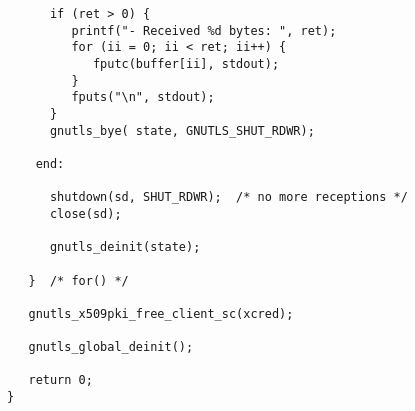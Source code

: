 \begin{verbatim}
      if (ret > 0) {
         printf("- Received %d bytes: ", ret);
         for (ii = 0; ii < ret; ii++) {
            fputc(buffer[ii], stdout);
         }
         fputs("\n", stdout);
      }
      gnutls_bye( state, GNUTLS_SHUT_RDWR);

    end:

      shutdown(sd, SHUT_RDWR);  /* no more receptions */
      close(sd);

      gnutls_deinit(state);

   }  /* for() */

   gnutls_x509pki_free_client_sc(xcred);

   gnutls_global_deinit();

   return 0;
}

\end{verbatim}
